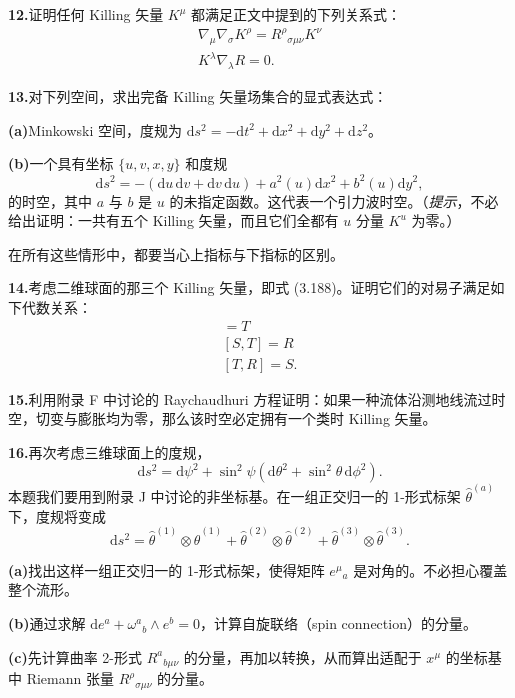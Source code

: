\textbf{12.}\quad 证明任何 Killing 矢量 $K^{\mu}$ 都满足正文中提到的下列关系式：
\begin{gather*}
\nabla_{\mu}\nabla_{\sigma}K^{\rho} = R^{\rho}{}_{\sigma\mu\nu}K^{\nu}\\
K^{\lambda}\nabla_{\lambda}R = 0.
\tag{3.223}
\end{gather*}

\textbf{13.}\quad 对下列空间，求出完备 Killing 矢量场集合的显式表达式：

\textbf{(a)}\quad Minkowski 空间，度规为 $\mathrm{d}s^{2}=-\mathrm{d}t^{2}+\mathrm{d}x^{2}+\mathrm{d}y^{2}+\mathrm{d}z^{2}$。

\textbf{(b)}\quad 一个具有坐标 $\{u,v,x,y\}$ 和度规
\begin{equation*}
\mathrm{d}s^{2} = -(\mathrm{d}u\,\mathrm{d}v + \mathrm{d}v\,\mathrm{d}u) + a^{2}(u)\mathrm{d}x^{2} + b^{2}(u)\mathrm{d}y^{2},
\tag{3.224}
\end{equation*}
的时空，其中 $a$ 与 $b$ 是 $u$ 的未指定函数。这代表一个引力波时空。（\emph{提示}，不必给出证明：一共有五个 Killing 矢量，而且它们全都有 $u$ 分量 $K^{u}$ 为零。）

在所有这些情形中，都要当心上指标与下指标的区别。

\textbf{14.}\quad 考虑二维球面的那三个 Killing 矢量，即式 (3.188)。证明它们的对易子满足如下代数关系：
\begin{gather*}
[R, S] = T\\
[S, T] = R\\
[T, R] = S.
\tag{3.225}
\end{gather*}

\textbf{15.}\quad 利用附录 F 中讨论的 Raychaudhuri 方程证明：如果一种流体沿测地线流过时空，切变与膨胀均为零，那么该时空必定拥有一个类时 Killing 矢量。

\textbf{16.}\quad 再次考虑三维球面上的度规，
\begin{equation*}
\mathrm{d}s^{2} = \mathrm{d}\psi^{2} + \sin^{2}\psi(\mathrm{d}\theta^{2} + \sin^{2}\theta\,\mathrm{d}\phi^{2}).
\tag{3.226}
\end{equation*}
本题我们要用到附录 J 中讨论的非坐标基。在一组正交归一的 1-形式标架 $\hat{\theta}^{(a)}$ 下，度规将变成
\begin{equation*}
\mathrm{d}s^{2} = \hat{\theta}^{(1)}\otimes\hat{\theta}^{(1)} + \hat{\theta}^{(2)}\otimes\hat{\theta}^{(2)} + \hat{\theta}^{(3)}\otimes\hat{\theta}^{(3)}.
\tag{3.227}
\end{equation*}

\textbf{(a)}\quad 找出这样一组正交归一的 1-形式标架，使得矩阵 $e^{\mu}{}_{a}$ 是对角的。不必担心覆盖整个流形。

\textbf{(b)}\quad 通过求解 $\mathrm{d}e^{a} + \omega^{a}{}_{b}\wedge e^{b} = 0$，计算自旋联络（spin connection）的分量。

\textbf{(c)}\quad 先计算曲率 2-形式 $R^{a}{}_{b\mu\nu}$ 的分量，再加以转换，从而算出适配于 $x^{\mu}$ 的坐标基中 Riemann 张量 $R^{\rho}{}_{\sigma\mu\nu}$ 的分量。
